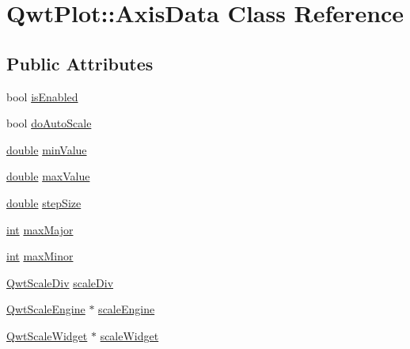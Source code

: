 \hypertarget{class_qwt_plot_1_1_axis_data}{\section{Qwt\-Plot\-:\-:Axis\-Data Class Reference}
\label{class_qwt_plot_1_1_axis_data}
}
\subsection*{Public Attributes}
\begin{DoxyCompactItemize}
\item 
bool \hyperlink{class_qwt_plot_1_1_axis_data_ab9c68fea44a479e89fb1760b53aafe7d}{is\-Enabled}
\item 
bool \hyperlink{class_qwt_plot_1_1_axis_data_ac7f9fe88876df54341e4d4c10a79a7e5}{do\-Auto\-Scale}
\item 
\hyperlink{_super_l_u_support_8h_a8956b2b9f49bf918deed98379d159ca7}{double} \hyperlink{class_qwt_plot_1_1_axis_data_a8976da918565bb63416cb683ed1b9f7f}{min\-Value}
\item 
\hyperlink{_super_l_u_support_8h_a8956b2b9f49bf918deed98379d159ca7}{double} \hyperlink{class_qwt_plot_1_1_axis_data_a3c1bb666b282447afdd57b7e29b02fb7}{max\-Value}
\item 
\hyperlink{_super_l_u_support_8h_a8956b2b9f49bf918deed98379d159ca7}{double} \hyperlink{class_qwt_plot_1_1_axis_data_a64c8250b9cb2adf93aa7beda7ffcc257}{step\-Size}
\item 
\hyperlink{ioapi_8h_a787fa3cf048117ba7123753c1e74fcd6}{int} \hyperlink{class_qwt_plot_1_1_axis_data_a8e8933b6ead829dc50689e51acd0d619}{max\-Major}
\item 
\hyperlink{ioapi_8h_a787fa3cf048117ba7123753c1e74fcd6}{int} \hyperlink{class_qwt_plot_1_1_axis_data_a88eee27f67093c1d200021ab4acb0c81}{max\-Minor}
\item 
\hyperlink{class_qwt_scale_div}{Qwt\-Scale\-Div} \hyperlink{class_qwt_plot_1_1_axis_data_a59fd6434f3835fd3f5a1a10898b0da87}{scale\-Div}
\item 
\hyperlink{class_qwt_scale_engine}{Qwt\-Scale\-Engine} $\ast$ \hyperlink{class_qwt_plot_1_1_axis_data_a068e9476a04fdb1905f7c387d4d33c66}{scale\-Engine}
\item 
\hyperlink{class_qwt_scale_widget}{Qwt\-Scale\-Widget} $\ast$ \hyperlink{class_qwt_plot_1_1_axis_data_a98b3716a5d277081812dcc4a2cec23a5}{scale\-Widget}
\end{DoxyCompactItemize}


